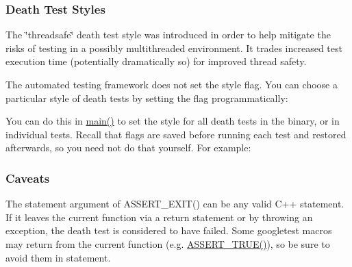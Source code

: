 \subsubsection*{Death Test Styles}

The \char`\"{}threadsafe\char`\"{} death test style was introduced in order to help mitigate the risks of testing in a possibly multithreaded environment. It trades increased test execution time (potentially dramatically so) for improved thread safety.

The automated testing framework does not set the style flag. You can choose a particular style of death tests by setting the flag programmatically\+:


\begin{DoxyCode}{0}
\end{DoxyCode}


You can do this in {\ttfamily \mbox{\hyperlink{3_814_83_2CompilerIdC_2CMakeCCompilerId_8c_a0ddf1224851353fc92bfbff6f499fa97}{main()}}} to set the style for all death tests in the binary, or in individual tests. Recall that flags are saved before running each test and restored afterwards, so you need not do that yourself. For example\+:


\begin{DoxyCode}{0}
\DoxyCodeLine{\}}
\DoxyCodeLine{}
\DoxyCodeLine{\}}
\DoxyCodeLine{}
\DoxyCodeLine{\}}
\end{DoxyCode}


\subsubsection*{Caveats}

The {\ttfamily statement} argument of {\ttfamily A\+S\+S\+E\+R\+T\+\_\+\+E\+X\+I\+T()} can be any valid C++ statement. If it leaves the current function via a {\ttfamily return} statement or by throwing an exception, the death test is considered to have failed. Some googletest macros may return from the current function (e.\+g. {\ttfamily \mbox{\hyperlink{gtest_8h_ae9244bfbda562e8b798789b001993fa5}{A\+S\+S\+E\+R\+T\+\_\+\+T\+R\+U\+E()}}}), so be sure to avoid them in {\ttfamily statement}.

